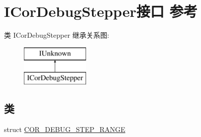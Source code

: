 \hypertarget{interface_i_cor_debug_stepper}{}\section{I\+Cor\+Debug\+Stepper接口 参考}
\label{interface_i_cor_debug_stepper}
类 I\+Cor\+Debug\+Stepper 继承关系图\+:\begin{figure}[H]
\begin{center}
\leavevmode
\includegraphics[height=2.000000cm]{interface_i_cor_debug_stepper}
\end{center}
\end{figure}
\subsection*{类}
\begin{DoxyCompactItemize}
\item 
struct \hyperlink{struct_i_cor_debug_stepper_1_1_c_o_r___d_e_b_u_g___s_t_e_p___r_a_n_g_e}{C\+O\+R\+\_\+\+D\+E\+B\+U\+G\+\_\+\+S\+T\+E\+P\+\_\+\+R\+A\+N\+GE}
\end{DoxyCompactItemize}

